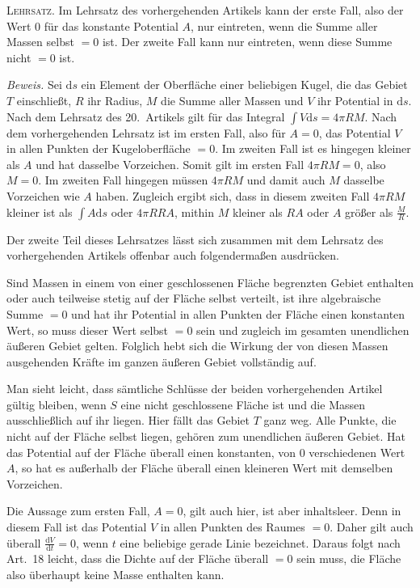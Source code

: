 \textsc{Lehrsatz.} Im Lehrsatz des vorhergehenden Artikels kann der erste Fall, also der Wert $0$ für das konstante Potential $A$, nur eintreten, wenn die Summe aller Massen selbst $=0$ ist. Der zweite Fall kann nur eintreten, wenn diese Summe nicht $=0$ ist.

\textit{Beweis.} Sei $\mathrm ds$ ein Element der Oberfläche einer beliebigen Kugel, die das Gebiet $T$ einschließt, $R$ ihr Radius, $M$ die Summe aller Massen und $V$ ihr Potential in $\mathrm ds$. Nach dem Lehrsatz des 20.\ Artikels gilt für das Integral $\int V\mathrm ds=4\pi RM$. Nach dem vorhergehenden Lehrsatz ist im ersten Fall, also für $A=0$, das Potential $V$ in allen Punkten der Kugeloberfläche $=0$. Im zweiten Fall ist es hingegen kleiner als $A$ und hat dasselbe Vorzeichen. Somit gilt im ersten Fall $4\pi RM=0$, also $M=0$. Im zweiten Fall hingegen müssen $4\pi RM$ und damit auch $M$ dasselbe Vorzeichen wie $A$ haben. Zugleich ergibt sich, dass in diesem zweiten Fall $4\pi RM$ kleiner ist als $\int A\mathrm ds$ oder $4\pi RRA$, mithin $M$ kleiner als $RA$ oder $A$ größer als $\frac{M}{R}$.

Der zweite Teil dieses Lehrsatzes lässt sich zusammen mit dem Lehrsatz des vorhergehenden Artikels offenbar auch folgendermaßen ausdrücken.

Sind Massen in einem von einer geschlossenen Fläche begrenzten Gebiet enthalten oder auch teilweise stetig auf der Fläche selbst verteilt, ist ihre algebraische Summe $=0$ und hat ihr Potential in allen Punkten der Fläche einen konstanten Wert, so muss dieser Wert selbst $=0$
sein und zugleich im gesamten unendlichen äußeren Gebiet gelten. Folglich hebt sich die Wirkung der von diesen Massen ausgehenden Kräfte im ganzen äußeren Gebiet vollständig auf.

Man sieht leicht, dass sämtliche Schlüsse der beiden vorhergehenden Artikel gültig bleiben, wenn $S$ eine nicht geschlossene Fläche ist und die Massen ausschließlich auf ihr liegen. Hier fällt das Gebiet $T$ ganz weg. Alle Punkte, die nicht auf der Fläche selbst liegen, gehören zum unendlichen äußeren Gebiet. Hat das Potential auf der Fläche überall einen konstanten, von $0$ verschiedenen Wert $A$, so hat es außerhalb der Fläche überall einen kleineren Wert mit demselben Vorzeichen.

Die Aussage zum ersten Fall, $A=0$, gilt auch hier, ist aber inhaltsleer. Denn in diesem Fall ist das Potential $V$ in allen Punkten des Raumes $=0$. Daher gilt auch überall $\frac{\mathrm dV}{\mathrm dt}=0$, wenn $t$ eine beliebige gerade Linie bezeichnet. Daraus folgt nach Art.\ 18 leicht, dass die Dichte auf der Fläche überall $=0$ sein muss, die Fläche also überhaupt keine Masse enthalten kann.

